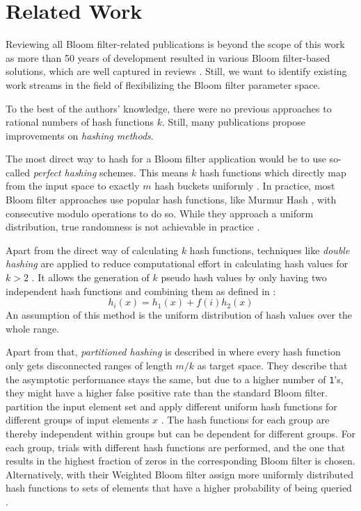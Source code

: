 \section{Related Work}
Reviewing all Bloom filter-related publications is beyond the scope of this work as more than 50 years of development resulted in various Bloom filter-based solutions, which are well captured in reviews \cite{Abdennebi.2021, Putze.2009,Patgiri.2018, Gupta.2017}. Still, we want to identify existing work streams in the field of flexibilizing the Bloom filter parameter space.%

To the best of the authors' knowledge, there were no previous approaches to rational numbers of hash functions $k$. Still, many publications propose improvements on \textit{hashing methods}.

The most direct way to hash for a Bloom filter application would be to use so-called \textit{perfect hashing} schemes. This means $k$ hash functions which directly map from the input space to exactly $m$ hash buckets uniformly \cite{Gupta.2017}.
In practice, most Bloom filter approaches use popular hash functions, like Murmur Hash \cite{Appleby.2008}, with consecutive modulo operations to do so. While they approach a uniform distribution, true randomness is not achievable in practice \cite{Estebanez.2014}. 

Apart from the direct way of calculating $k$ hash functions, techniques like \textit{double hashing} are applied to reduce computational effort in calculating hash values for $k>2$ \cite{Gupta.2017}. It allows the generation of $k$ pseudo hash values by only having two independent hash functions and combining them as defined in \cite{Kirsch.2006}:
\begin{equation}
    h_i(x)=h_1(x)+f(i)h_2(x)
    \label{eq:efficienthash}
\end{equation}
An assumption of this method is the uniform distribution of hash values over the whole range.

Apart from that, \textit{partitioned hashing} is described in \cite{Gupta.2017} where every hash function only gets disconnected ranges of length $m/k$ as target space. They describe that the asymptotic performance stays the same, but due to a higher number of \texttt{1}'s, they might have a higher false positive rate than the standard Bloom filter. 
\citeauthor{Hao.2007} partition the input element set and apply different uniform hash functions for different groups of input elements $x$ \cite{Hao.2007}. The hash functions for each group are thereby independent within groups but can be dependent for different groups. For each group, trials with different hash functions are performed, and the one that results in the highest fraction of zeros in the corresponding Bloom filter is chosen. Alternatively, \citeauthor{Bruck.2006} with their Weighted Bloom filter assign more uniformly distributed hash functions to sets of elements that have a higher probability of being queried \cite{Bruck.2006}.

